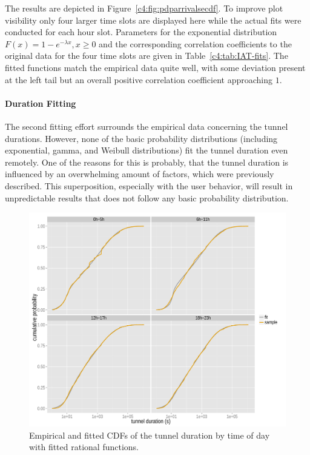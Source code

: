 The results are depicted in Figure~\ref{c4:fig:pdparrivalsecdf}. To improve plot visibility only four larger time slots are displayed here while the actual fits were conducted for each hour slot. Parameters for the exponential distribution $F(x) = 1- e^{-\lambda x}, x \geq 0$ and the corresponding correlation coefficients to the original data for the four time slots are given in Table~\ref{c4:tab:IAT-fits}. The fitted functions match the empirical data quite well, with some deviation present at the left tail but an overall positive correlation coefficient approaching $1$.


\paragraph{Duration Fitting}

The second fitting effort surrounds the empirical data concerning the tunnel durations. However, none of the basic probability distributions (including exponential, gamma, and Weibull distributions) fit the tunnel duration even remotely. One of the reasons for this is probably, that the tunnel duration is influenced by an overwhelming amount of factors, which were previously described. This superposition, especially with the user behavior, will result in unpredictable results that does not follow any basic probability distribution.

\begin{figure}[htb]
	\centering
	\includegraphics[width=1.0\textwidth]{images/R-duration-fit-cdf-facets.pdf}
	\caption{Empirical and fitted \glspl{CDF} of the tunnel duration by time of day with fitted rational functions.}
\label{c4:fig:fittedsdurationlots}
\end{figure}

